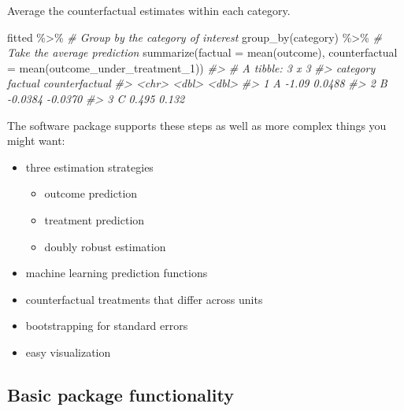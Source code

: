 \documentclass[
]{article}
\newenvironment{Shaded}{\begin{snugshade}}{\end{snugshade}}
\newcommand{\AttributeTok}[1]{\textcolor[rgb]{0.77,0.63,0.00}{#1}}
\newcommand{\CommentTok}[1]{\textcolor[rgb]{0.56,0.35,0.01}{\textit{#1}}}
\newcommand{\FunctionTok}[1]{\textcolor[rgb]{0.00,0.00,0.00}{#1}}
\newcommand{\NormalTok}[1]{#1}
\newcommand{\SpecialCharTok}[1]{\textcolor[rgb]{0.00,0.00,0.00}{#1}}
\providecommand{\tightlist}{%
  \setlength{\itemsep}{0pt}\setlength{\parskip}{0pt}}
\begin{document}
Average the counterfactual estimates within each category.

\begin{Shaded}
\begin{Highlighting}[]
\NormalTok{fitted }\SpecialCharTok{\%\textgreater{}\%}
  \CommentTok{\# Group by the category of interest}
  \FunctionTok{group\_by}\NormalTok{(category) }\SpecialCharTok{\%\textgreater{}\%}
  \CommentTok{\# Take the average prediction}
  \FunctionTok{summarize}\NormalTok{(}\AttributeTok{factual =} \FunctionTok{mean}\NormalTok{(outcome),}
            \AttributeTok{counterfactual =} \FunctionTok{mean}\NormalTok{(outcome\_under\_treatment\_1))}
\CommentTok{\#\textgreater{} \# A tibble: 3 x 3}
\CommentTok{\#\textgreater{}   category factual counterfactual}
\CommentTok{\#\textgreater{}   \textless{}chr\textgreater{}      \textless{}dbl\textgreater{}          \textless{}dbl\textgreater{}}
\CommentTok{\#\textgreater{} 1 A        {-}1.09           0.0488}
\CommentTok{\#\textgreater{} 2 B        {-}0.0384        {-}0.0370}
\CommentTok{\#\textgreater{} 3 C         0.495          0.132}
\end{Highlighting}
\end{Shaded}

The software package supports these steps as well as more complex things you might want:

\begin{itemize}
\tightlist
\item
  three estimation strategies

  \begin{itemize}
  \tightlist
  \item
    outcome prediction
  \item
    treatment prediction
  \item
    doubly robust estimation
  \end{itemize}
\item
  machine learning prediction functions
\item
  counterfactual treatments that differ across units
\item
  bootstrapping for standard errors
\item
  easy visualization
\end{itemize}

\hypertarget{basic-package-functionality}{%
\subsection{Basic package functionality}\label{basic-package-functionality}}
\end{document}

